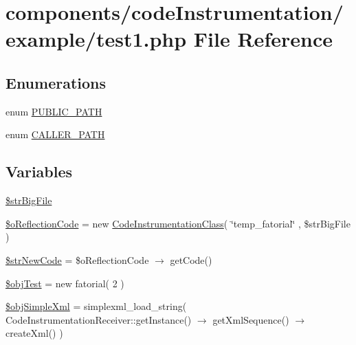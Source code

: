 \hypertarget{code_instrumentation_2example_2test1_8php}{
\section{components/codeInstrumentation/example/test1.php File Reference}
\label{code_instrumentation_2example_2test1_8php}
}
\subsection*{Enumerations}
\begin{CompactItemize}
\item 
enum \hyperlink{code_instrumentation_2example_2test1_8php_b72f88470e4eee5518bfc7c908101d80}{PUBLIC\_\-PATH} 
\item 
enum \hyperlink{code_instrumentation_2example_2test1_8php_58763391df8832eea0c173fe59e5c977}{CALLER\_\-PATH} 
\end{CompactItemize}
\subsection*{Variables}
\begin{CompactItemize}
\item 
\hyperlink{code_instrumentation_2example_2test1_8php_78bb668948bf961e4e27227e71de5850}{\$strBigFile}
\item 
\hyperlink{code_instrumentation_2example_2test1_8php_dff853bfc3335950f89bfb9e1a779c7e}{\$oReflectionCode} = new \hyperlink{class_code_instrumentation_class}{CodeInstrumentationClass}( \char`\"{}temp\_\-fatorial\char`\"{} , \$strBigFile )
\item 
\hyperlink{code_instrumentation_2example_2test1_8php_882f0b62de6f379d0e0cf88ef6658601}{\$strNewCode} = \$oReflectionCode $\rightarrow$ getCode()
\item 
\hyperlink{code_instrumentation_2example_2test1_8php_e72f9ac2779bbc5e49a4a9df50c17c73}{\$objTest} = new fatorial( 2 )
\item 
\hyperlink{code_instrumentation_2example_2test1_8php_da23b058075209c6506f7b0b1bb0d5bf}{\$objSimpleXml} = simplexml\_\-load\_\-string( CodeInstrumentationReceiver::getInstance() $\rightarrow$ getXmlSequence() $\rightarrow$ createXml() )
\end{CompactItemize}


